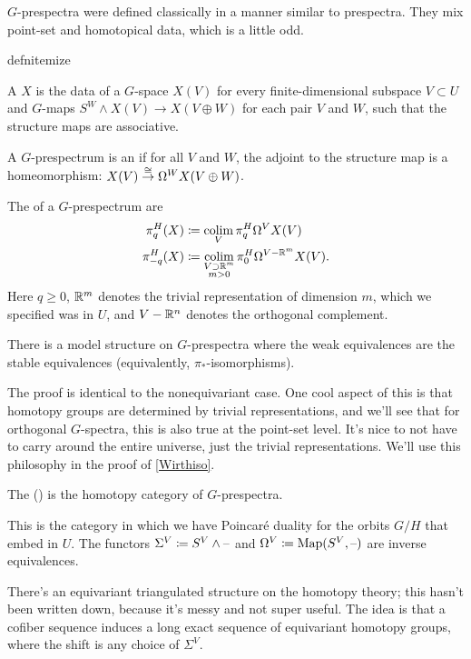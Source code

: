 $G$-prespectra were defined classically in a manner similar to prespectra. They mix point-set and homotopical data,
which is a little odd.
\begin{comp}{defn}{itemize}
	\item A  $X$ is the data of a $G$-space $X(V)$ for every finite-dimensional subspace
	$V\subset U$ and $G$-maps $S^W\wedge X(V)\to X(V\oplus W)$ for each pair $V$ and $W$, such that the structure
	maps are associative.
	\item A $G$-prespectrum is an  if for all $V$ and $W$, the adjoint to the structure
	map is a homeomorphism: $X(V)\stackrel\cong\to\Omega^W X(V\oplus W)$.
	\item The  of a $G$-prespectrum are
	\begin{align*}
		\pi_q^H(X) &\coloneqq \operatorname*{colim}_V \pi_q^H \Omega^V X(V)\\
		\pi_{-q}^H(X) &\coloneqq \operatorname*{colim}_{\substack{V\supset\mathbb R^m\\m > 0}} \pi_0^H\Omega^{V - \mathbb R^m}X(V).
	\end{align*}
	Here $q\ge 0$, $\mathbb R^m$ denotes the trivial representation of dimension $m$, which we specified was in $U$, and
	$V - \mathbb R^n$ denotes the orthogonal complement.
\end{comp}
\begin{prop}
There is a model structure on $G$-prespectra where the weak equivalences are the stable equivalences (equivalently,
$\pi_*$-isomorphisms).
\end{prop}
The proof is identical to the nonequivariant case. One cool aspect of this is that homotopy groups are determined
by trivial representations, and we'll see that for orthogonal $G$-spectra, this is also true at the point-set
level. It's nice to not have to carry around the entire universe, just the trivial representations. We'll use this
philosophy in the proof of \cref{Wirthiso}.
\begin{defn}
The  () is the homotopy category of $G$-prespectra.
\end{defn}
This is the category in which we have Poincaré duality for the orbits $G/H$ that embed in $U$. The functors
$\Sigma^V\coloneqq S^V\wedge\text{--}$ and $\Omega^V\coloneqq\operatorname{Map}(S^V,\text{--})$ are inverse equivalences.

There's an equivariant triangulated structure on the homotopy theory; this hasn't been written down, because it's
messy and not super useful. The idea is that a cofiber sequence induces a long exact sequence of equivariant
homotopy groups, where the shift is any choice of $\Sigma^V$.
